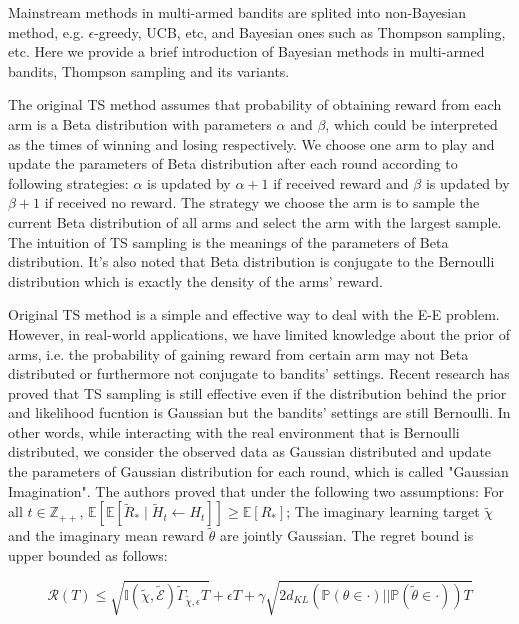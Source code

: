 \documentclass{article}
\begin{document}
Mainstream methods in multi-armed bandits are splited into non-Bayesian method, e.g. $\epsilon$-greedy, UCB, etc, and Bayesian ones such as Thompson sampling, etc. Here we provide a brief introduction of Bayesian methods in multi-armed bandits, Thompson sampling and its variants.

The original TS method assumes that probability of obtaining reward from each arm is a Beta distribution with parameters $\alpha$ and $\beta$, which could be interpreted as the times of winning and losing respectively. We choose one arm to play and update the parameters of Beta distribution after each round according to following strategies: $\alpha$ is updated by $\alpha + 1$ if received reward and $\beta$ is updated by $\beta + 1$ if received no reward. The strategy we choose the arm is to sample the current Beta distribution of all arms and select the arm with the largest sample. The intuition of TS sampling is the meanings of the parameters of Beta distribution. It's also noted that Beta distribution is conjugate to the Bernoulli distribution which is exactly the density of the arms' reward.

Original TS method is a simple and effective way to deal with the E-E problem. However, in real-world applications, we have limited knowledge about the prior of arms, i.e. the probability of gaining reward from certain arm may not Beta distributed or furthermore not conjugate to bandits' settings. Recent research \cite{GIBL} has proved that TS sampling is still effective even if the distribution behind the prior and likelihood fucntion is Gaussian but the bandits' settings are still Bernoulli. In other words, while interacting with the real environment that is Bernoulli distributed, we consider the observed data as Gaussian distributed and update the parameters of Gaussian distribution for each round, which is called "Gaussian Imagination". The authors proved that under the following two assumptions: For all $t \in \mathbb{Z}_{++}$, $\mathbb{E}\left[\mathbb{E}\left[\tilde{R}_{*} \mid \tilde{H}_{t} \leftarrow H_{t}\right]\right] \geq \mathbb{E}\left[R_{*}\right]$; The imaginary learning target $\tilde{\chi}$ and the imaginary mean reward  $\tilde{\theta}$ are jointly Gaussian. The regret bound is upper bounded as follows:

\begin{equation}
  \mathcal{R}(T) \leq \sqrt{\mathbb{I}(\tilde{\chi},\tilde{\mathcal{E}}) \tilde{\Gamma}_{\tilde{\chi},\epsilon} T} + \epsilon T + \gamma \sqrt{2d_{KL} (\mathbb{P}(\theta \in \cdot) || \mathbb{P}(\tilde{\theta} \in \cdot)) T }
\end{equation}
\end{document}
